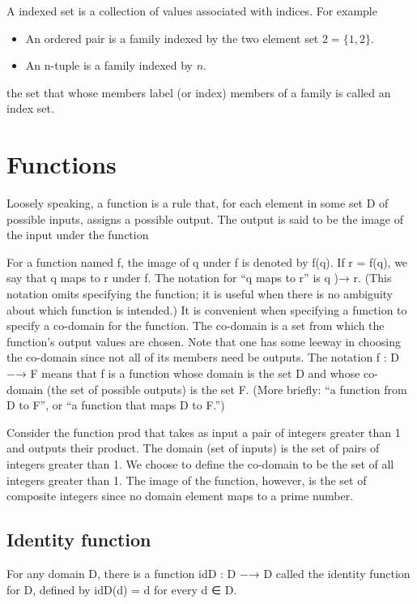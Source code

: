 A indexed set is a collection of values associated with indices. For example
\begin{itemize}
\item An ordered pair is a family indexed by the two element set $2 = \{1, 2\}$.
\item An n-tuple is a family indexed by $n$.
\end{itemize}
the set that whose members label (or index) members of a family is called an index set. 

\section{Functions}

Loosely speaking, a function is a rule that, for each element in some set D of possible inputs,  assigns a possible output. The output is said to be the image of the input under the function 

For a function named f, the image of q under f is denoted by f(q). If r = f(q), we say that  q maps to r under f. The notation for “q maps to r” is q )→ r. (This notation omits specifying  the function; it is useful when there is no ambiguity about which function is intended.)  It is convenient when specifying a function to specify a co-domain for the function. The  co-domain is a set from which the function’s output values are chosen. Note that one has some  leeway in choosing the co-domain since not all of its members need be outputs.  The notation  f : D −→ F  means that f is a function whose domain is the set D and whose co-domain (the set of possible  outputs) is the set F. (More briefly: “a function from D to F”, or “a function that maps D to F.”) 

Consider the function prod that takes as input a pair of integers greater than  1 and outputs their product. The domain (set of inputs) is the set of pairs of integers greater  than 1. We choose to define the co-domain to be the set of all integers greater than 1. The  image of the function, however, is the set of composite integers since no domain element maps  to a prime number. 

\subsection{Identity function} 
For any domain D, there is a function idD : D −→ D called the identity function for D, defined  by  idD(d) = d  for every d ∈ D. 


